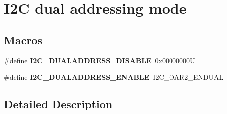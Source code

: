 \hypertarget{group___i2_c__dual__addressing__mode}{}\section{I2C dual addressing mode}
\label{group___i2_c__dual__addressing__mode}
\subsection*{Macros}
\begin{DoxyCompactItemize}
\item 
\mbox{\label{group___i2_c__dual__addressing__mode_gacb8f4a1fd543e5ef2c9e7711fc9b5a67}} 
\#define {\bfseries I2\+C\+\_\+\+D\+U\+A\+L\+A\+D\+D\+R\+E\+S\+S\+\_\+\+D\+I\+S\+A\+B\+LE}~0x00000000U
\item 
\mbox{\label{group___i2_c__dual__addressing__mode_gae33ff5305d9f38d857cff1774f481fab}} 
\#define {\bfseries I2\+C\+\_\+\+D\+U\+A\+L\+A\+D\+D\+R\+E\+S\+S\+\_\+\+E\+N\+A\+B\+LE}~I2\+C\+\_\+\+O\+A\+R2\+\_\+\+E\+N\+D\+U\+AL
\end{DoxyCompactItemize}


\subsection{Detailed Description}
